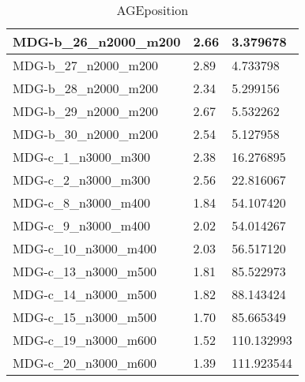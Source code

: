\documentclass[10pt,a4paper]{article}
\begin{document}
\begin{table}[]
\begin{tabular}{|l|l|l|}
		MDG-b\_26\_n2000\_m200 & 2.66                               & 3.379678                             \\ \hline
		MDG-b\_27\_n2000\_m200 & 2.89                               & 4.733798                             \\ \hline
		MDG-b\_28\_n2000\_m200 & 2.34                               & 5.299156                             \\ \hline
		MDG-b\_29\_n2000\_m200 & 2.67                               & 5.532262                             \\ \hline
		MDG-b\_30\_n2000\_m200 & 2.54                               & 5.127958                             \\ \hline
		MDG-c\_1\_n3000\_m300  & 2.38                               & 16.276895                            \\ \hline
		MDG-c\_2\_n3000\_m300  & 2.56                               & 22.816067                            \\ \hline
		MDG-c\_8\_n3000\_m400  & 1.84                               & 54.107420                            \\ \hline
		MDG-c\_9\_n3000\_m400  & 2.02                               & 54.014267                            \\ \hline
		MDG-c\_10\_n3000\_m400 & 2.03                               & 56.517120                            \\ \hline
		MDG-c\_13\_n3000\_m500 & 1.81                               & 85.522973                            \\ \hline
		MDG-c\_14\_n3000\_m500 & 1.82                               & 88.143424                            \\ \hline
		MDG-c\_15\_n3000\_m500 & 1.70                               & 85.665349                            \\ \hline
		MDG-c\_19\_n3000\_m600 & 1.52                               & 110.132993                           \\ \hline
		MDG-c\_20\_n3000\_m600 & 1.39                               & 111.923544                           \\ \hline
	\end{tabular}
	\caption{AGEposition}
	\label{table:AGEposition}
\end{table}
\end{document}
